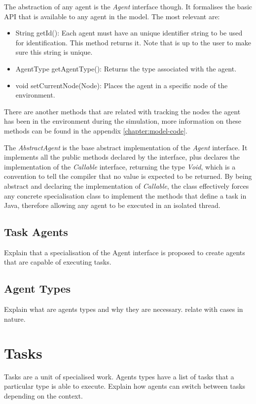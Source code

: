 The abstraction of any agent is the \emph{Agent} interface though. It formalises the basic API that is available to any agent in the model. The most relevant are:

\begin{itemize}
  \item String getId(): Each agent must have an unique identifier string to be used for identification. This method returns it. Note that is up to the user to make sure this string is unique.
  
  \item AgentType getAgentType(): Returns the type associated with the agent.
  
  \item void setCurrentNode(Node): Places the agent in a specific node of the environment.
\end{itemize}

There are another methods that are related with tracking the nodes the agent has been in the environment during the simulation, more information on these methods can be found in the appendix \ref{chapter:model-code}.

The \emph{AbstractAgent} is the base abstract implementation of the \emph{Agent} interface. It implements all the public methods declared by the interface, plus declares the implementation of the \emph{Callable} interface, returning the type \emph{Void}, which is a convention to tell the compiler that no value is expected to be returned. By being abstract and declaring the implementation of \emph{Callable}, the class effectively forces any concrete specialisation class to implement the methods that define a task in Java, therefore allowing any agent to be executed in an isolated thread.

\subsection{Task Agents}

Explain that a specialisation of the Agent interface is proposed to create agents that are capable of executing tasks.

\subsection{Agent Types}
\label{sec:agent-types}

Explain what are agents types and why they are necessary. relate with cases in nature.

\section {Tasks}

Tasks are a unit of specialised work. Agents types have a list of tasks that a particular type is able to execute. Explain how agents can switch between tasks depending on the context.
